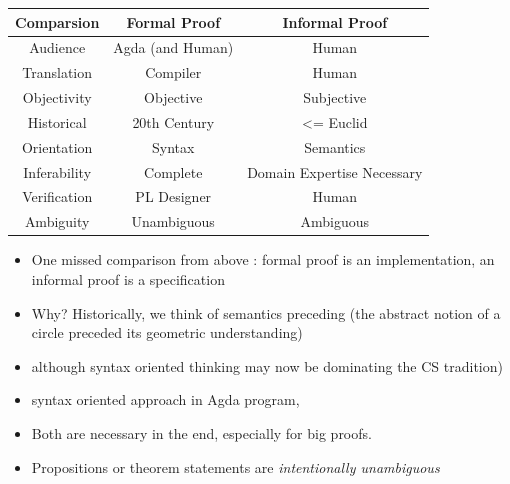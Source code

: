 \documentclass[10pt]{beamer}
\begin{document}
\begin{frame}



\centering




\begin{tabular}{|c|c|c|} \hline
  Comparsion & Formal Proof & Informal Proof \\ \hline
  Audience & Agda (and Human) & Human \\ \hline
  Translation & Compiler & Human \\ \hline
  Objectivity & Objective & Subjective \\ \hline %
  Historical & 20th Century & <= Euclid \\ \hline
  Orientation & Syntax & Semantics \\ \hline
  Inferability & Complete & Domain Expertise Necessary \\ \hline
  Verification & PL Designer & Human \\ \hline
  Ambiguity & Unambiguous & Ambiguous \\ \hline

\end{tabular}


\end{frame}

\begin{frame}

\begin{itemize}
\item One missed comparison from above :  formal proof is an implementation, an informal proof is a specification

\item Why? Historically, we think of semantics preceding (the abstract notion of a
  circle preceded its geometric understanding)
\item although syntax oriented thinking may now be dominating the CS tradition)
\item syntax oriented approach in Agda program,
\item Both are necessary in the end, especially for big proofs.
\item  Propositions or theorem statements are \emph{intentionally unambiguous}

\end{itemize}


\end{frame}
\end{document}
